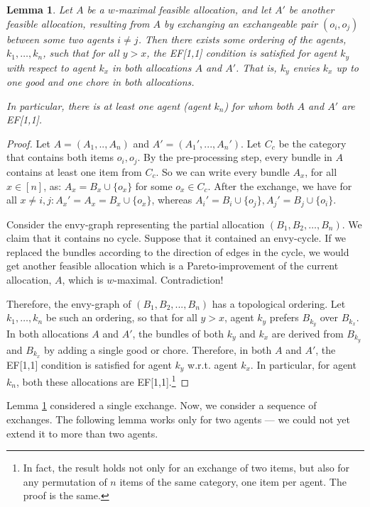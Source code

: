 \documentclass[sigconf]{aamas}
\newtheorem{lemma}[theorem]{Lemma}
\theoremstyle{definition}
\begin{document}
\begin{lemma}
\label{both-EF1-for-someone}
Let $A$ be a $w$-maximal feasible allocation, 
and let $A'$ be another feasible allocation, resulting from $A$ by exchanging an exchangeable pair $(o_{i},o_{j})$ between some two agents $i\neq j$. 
Then there exists some ordering of the agents, $k_1,\ldots,k_n$, such that for all $y>x$, the EF[1,1] condition is satisfied for agent $k_y$ with respect to agent $k_x$ in \emph{both} allocations $A$ and $A'$. 
That is, $k_y$ envies $k_x$ up to one good and one chore in both allocations. 

In particular, there is at least one agent (agent $k_n$) for whom \emph{both} $A$ and $A'$ are EF[1,1].
\end{lemma}
\begin{proof}
Let $A=(A_1,..,A_n)$ and
$A' = (A_1',...,A_n')$.
Let $C_c$ be the category that contains both items $o_i, o_j$.
By the pre-processing step, every bundle in $A$ contains at least one item from $C_c$. So 
we can write every bundle $A_x$, for all $x\in [n]$, as: $A_x = B_x\cup \{o_x\}$ for some $o_x\in C_c$.
After the exchange, we have for all 
$x\neq i,j: A_x' = A_x = B_x\cup \{o_x\}$, whereas $A_i' = B_i\cup \{o_j\}, A_j' = B_j\cup \{o_i\}$.  

Consider the envy-graph representing the partial allocation $(B_1,B_2,\allowbreak\ldots,B_n)$.
We claim that it contains no cycle. Suppose that it contained an envy-cycle. If we replaced the bundles according to the direction of edges in the cycle, we would get another feasible allocation which is a Pareto-improvement of the current allocation, $A$, which is $w$-maximal. Contradiction!

Therefore, the envy-graph of 
$(B_1,B_2,...,B_n)$ has a topological ordering. 
Let $k_1,\ldots,k_n$ be such an ordering,
so that for all $y>x$, agent $k_y$ prefers $B_{k_y}$ over $B_{k_x}$.
In both allocations $A$ and $A'$, the bundles of both $k_y$ and $k_x$ are derived from $B_{k_y}$ and $B_{k_x}$ by adding a single good or chore. Therefore, in both $A$ and $A'$, the EF[1,1] condition is satisfied for agent $k_y$ w.r.t. agent $k_x$.
In particular, for agent $k_n$, both these allocations are EF[1,1].\footnote{In fact, the result holds not only for an exchange of two items, but also for any permutation of $n$ items of the same category, one item per agent. The proof is the same.}
\end{proof}
Lemma \ref{both-EF1-for-someone} considered a single exchange. Now, we consider a sequence of exchanges. 
The following lemma works only for two agents --- we could not yet extend it to more than two agents.
\end{document}
